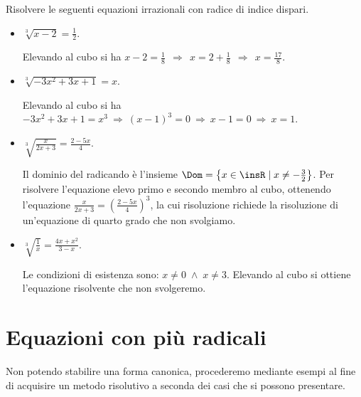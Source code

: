 \begin{exrig}
\begin{esempio}
Risolvere le seguenti equazioni irrazionali con radice di indice dispari.
\begin{itemize}
\item $\sqrt[3]{x-2}=\frac 1 2$.

Elevando al cubo si ha $x-2=\frac 1 8\ \:\Rightarrow\: \ x=2+\frac 1 8\ \:\Rightarrow\: \ x=\frac{17} 8$.

\item $\sqrt[3]{-3x^2+3x+1}=x$.

Elevando al cubo si ha $-3x^2+3x+1=x^3\:\Rightarrow\: (x-1)^3=0\:\Rightarrow\: x-1=0\:\Rightarrow\: x=1$.

\item $\sqrt[3]{\frac x{2x+3}}=\frac{2-5x} 4$.

Il dominio del radicando è l'insieme $\Dom=\left\{x\in \insR\mid x\neq -\frac 3 2\right\}$. Per risolvere l'equazione elevo primo e secondo membro al cubo, ottenendo l'equazione $\frac x{2x+3}=\left(\frac{2-5x} 4\right)^3$, la cui risoluzione richiede la risoluzione di un'equazione di quarto grado che non svolgiamo.

\item $ \sqrt[3]{\frac 1 x}=\frac{4x+x^2}{3-x}$.

Le condizioni di esistenza sono: $x\neq 0\;\wedge\; x\neq 3$. Elevando al cubo si ottiene l'equazione risolvente che non svolgeremo.
\end{itemize}
\end{esempio}
\end{exrig}

\ovalbox{\risolvii \ref{ese:8.1}, \ref{ese:8.2}, \ref{ese:8.3}, \ref{ese:8.4}, \ref{ese:8.5}, \ref{ese:8.6}, \ref{ese:8.7}, \ref{ese:8.8}, \ref{ese:8.9}}

\section{Equazioni con più radicali}

Non potendo stabilire una forma canonica, procederemo mediante esempi al fine di acquisire un metodo risolutivo a seconda dei casi che si possono presentare.

